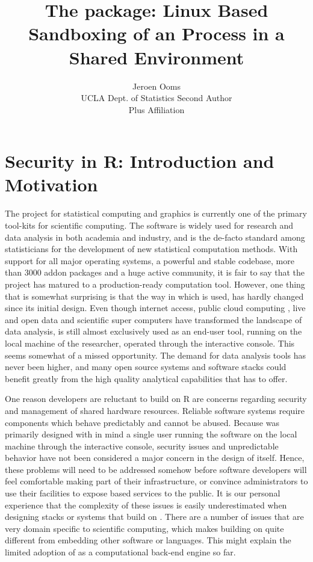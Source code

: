 \documentclass[article]{jss}
\author{Jeroen Ooms\\UCLA Dept. of Statistics \And
        Second Author\\Plus Affiliation}
\title{The \pkg{RAppArmor} package: Linux Based Sandboxing of an \proglang{R}
Process in a Shared Environment}
\begin{document}
\section{Security in R: Introduction and Motivation}

The  project for statistical computing and graphics
\citep{R-project} is currently one of the primary tool-kits for scientific
computing. The software is widely used for research and data analysis in both
academia and industry, and is the de-facto standard among statisticians for the
development of new statistical computation methods. With support for all major
operating systems, a powerful and stable codebase, more than 3000 addon
packages and a huge active community, it is fair to say that the project has
matured to a production-ready computation tool. However, one thing that is
somewhat surprising is that the way in which  is used, has hardly
changed since its initial design. Even though internet access, public
cloud computing \citep{armbrust2010view}, live and open data and scientific
super computers have transformed the landscape of data analysis, 
is still almost exclusively used as an end-user tool, running on the local
machine of the researcher, operated through the interactive console. This seems
somewhat of a missed opportunity. The demand for data analysis tools has never
been higher, and many open source systems and software stacks could benefit
greatly from the high quality analytical capabilities that  has to
offer.

One reason developers are reluctant to build on R are concerns regarding
security and management of shared hardware resources. Reliable software systems
require components which behave predictably and cannot be abused. Because
 was primarily designed with in mind a single user running the
software on the local machine through the interactive console, security issues
and unpredictable behavior have not been considered a major concern in the
design of  itself. Hence, these problems will need to be addressed
somehow before software developers will feel comfortable making 
part of their infrastructure, or convince administrators to use their
facilities to expose  based services to the public. It is our
personal experience that the complexity of these issues is easily
underestimated when designing stacks or systems that build on .
There are a number of issues that are very domain specific to scientific
computing, which makes building on  quite different from embedding
other software or languages. This might explain the limited adoption of
 as a computational back-end engine so far.
\end{document}

